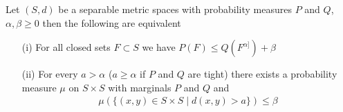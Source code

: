\begin{thm}\label{Strassen}Let $(S,d)$ be a separable metric spaces with probability measures $P$ and $Q$, $\alpha, \beta \geq 0$ then the following are equivalent
\begin{itemize}
\item[(i)] For all closed sets $F \subset S$ we have $P(F) \leq Q(F^{\alpha]}) + \beta$
\item[(ii)] For every $a > \alpha$ ($a \geq \alpha$ if $P$ and $Q$ are tight) there exists a probability measure $\mu$ on $S \times S$ with marginals $P$ and $Q$ and 
\begin{align*}
\mu\left (\lbrace (x,y) \in S \times S \mid d(x,y) > a \rbrace \right ) \leq \beta
\end{align*}
\end{itemize}
\end{thm}
